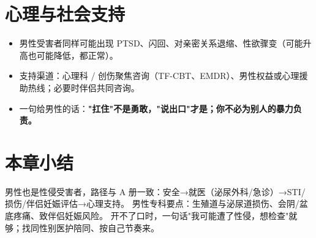 \section{心理与社会支持}
\begin{itemize}
  \item 男性受害者同样可能出现 PTSD、闪回、对亲密关系退缩、性欲骤变（可能升高也可能降低，都正常）。
  \item 支持渠道：心理科 / 创伤聚焦咨询（TF-CBT、EMDR）、男性权益或心理援助热线；必要时伴侣共同咨询。
  \item 一句给男性的话：\textbf{"扛住"不是勇敢，"说出口"才是；你不必为别人的暴力负责。}
\end{itemize}

\section{本章小结}
男性也是性侵受害者，路径与 A 册一致：安全→就医（泌尿外科/急诊）→STI/损伤/伴侣妊娠评估→心理支持。
男性专科要点：生殖道与泌尿道损伤、会阴/盆底疼痛、致伴侣妊娠风险。
开不了口时，一句话"我可能遭了性侵，想检查"就够；找同性别医护陪同、按自己节奏来。


